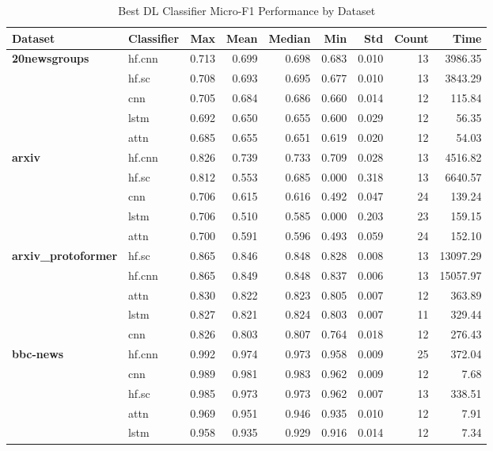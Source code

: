 \documentclass[final]{clv2025-revised}
\begin{document}
\begin{table}[h!]
\centering
\scriptsize
\caption{Best DL Classifier Micro-F1 Performance by Dataset}
\label{tab:dl_classifier_micro_f1}
\begin{tabular}{@{}p{2cm}p{1.2cm}rrrrrrr@{}}
\toprule
\textbf{Dataset} & \textbf{Classifier} & \textbf{Max} & \textbf{Mean} & \textbf{Median} & \textbf{Min} & \textbf{Std} & \textbf{Count} & \textbf{Time} \\
\midrule
\textbf{20newsgroups} & hf.cnn & 0.713 & 0.699 & 0.698 & 0.683 & 0.010 & 13 & 3986.35 \\
 & hf.sc & 0.708 & 0.693 & 0.695 & 0.677 & 0.010 & 13 & 3843.29 \\
 & cnn & 0.705 & 0.684 & 0.686 & 0.660 & 0.014 & 12 & 115.84 \\
 & lstm & 0.692 & 0.650 & 0.655 & 0.600 & 0.029 & 12 & 56.35 \\
 & attn & 0.685 & 0.655 & 0.651 & 0.619 & 0.020 & 12 & 54.03 \\
\midrule
\textbf{arxiv} & hf.cnn & 0.826 & 0.739 & 0.733 & 0.709 & 0.028 & 13 & 4516.82 \\
 & hf.sc & 0.812 & 0.553 & 0.685 & 0.000 & 0.318 & 13 & 6640.57 \\
 & cnn & 0.706 & 0.615 & 0.616 & 0.492 & 0.047 & 24 & 139.24 \\
 & lstm & 0.706 & 0.510 & 0.585 & 0.000 & 0.203 & 23 & 159.15 \\
 & attn & 0.700 & 0.591 & 0.596 & 0.493 & 0.059 & 24 & 152.10 \\
\midrule
\textbf{arxiv\_protoformer} & hf.sc & 0.865 & 0.846 & 0.848 & 0.828 & 0.008 & 13 & 13097.29 \\
 & hf.cnn & 0.865 & 0.849 & 0.848 & 0.837 & 0.006 & 13 & 15057.97 \\
 & attn & 0.830 & 0.822 & 0.823 & 0.805 & 0.007 & 12 & 363.89 \\
 & lstm & 0.827 & 0.821 & 0.824 & 0.803 & 0.007 & 11 & 329.44 \\
 & cnn & 0.826 & 0.803 & 0.807 & 0.764 & 0.018 & 12 & 276.43 \\
\midrule
\textbf{bbc-news} & hf.cnn & 0.992 & 0.974 & 0.973 & 0.958 & 0.009 & 25 & 372.04 \\
 & cnn & 0.989 & 0.981 & 0.983 & 0.962 & 0.009 & 12 & 7.68 \\
 & hf.sc & 0.985 & 0.973 & 0.973 & 0.962 & 0.007 & 13 & 338.51 \\
 & attn & 0.969 & 0.951 & 0.946 & 0.935 & 0.010 & 12 & 7.91 \\
 & lstm & 0.958 & 0.935 & 0.929 & 0.916 & 0.014 & 12 & 7.34 \\

\end{tabular}
\end{table}
\end{document}
